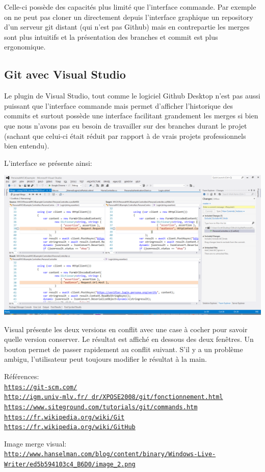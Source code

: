 Celle-ci possède des capacités plus limité que l’interface commande. Par exemple on ne peut pas cloner un directement depuis l’interface graphique un  repository d’un serveur git distant (qui n’est pas Github) mais en contrepartie les merges sont plus intuitifs et la présentation des branches et commit est plus ergonomique.

\subsection{Git avec Visual Studio}

Le plugin de Visual Studio, tout comme le logiciel Github Desktop n’est pas aussi puissant que l’interface commande mais permet d’afficher l’historique des commits et surtout possède une interface facilitant grandement les merges si bien que nous n’avons pas eu besoin de travailler sur des branches durant le projet (sachant que celui-ci était réduit par rapport à de vrais projets professionnels bien entendu).

L’interface se présente ainsi:

\begin{center}
	\includegraphics[width=.8\textwidth]{images/visual.png}
\end{center}

Visual présente les deux versions en conflit avec une case à cocher pour savoir quelle version conserver. Le résultat est affiché en dessous des deux fenêtres. Un bouton permet de passer rapidement au conflit suivant. S’il y a un problème ambigu, l’utilisateur peut toujours modifier le résultat à la main.
 
\noindent Références:\\
\href{https://git-scm.com/}{\texttt{https://git-scm.com/}}\\
\href{http://igm.univ-mlv.fr/~dr/XPOSE2008/git/fonctionnement.html}{\texttt{http://igm.univ-mlv.fr/~dr/XPOSE2008/git/fonctionnement.html}}\\
\href{https://www.siteground.com/tutorials/git/commands.htm}{\texttt{https://www.siteground.com/tutorials/git/commands.htm}}\\
\href{https://fr.wikipedia.org/wiki/Git}{\texttt{https://fr.wikipedia.org/wiki/Git}}\\
\href{https://fr.wikipedia.org/wiki/GitHub}{\texttt{https://fr.wikipedia.org/wiki/GitHub}}

\noindent Image merge visual:\\
\href{http://www.hanselman.com/blog/content/binary/Windows-Live-Writer/ed5b594103c4\_B6D0/image\_2.png}{\texttt{http://www.hanselman.com/blog/content/binary/Windows-Live-Writer/ed5b594103c4\_B6D0/image\_2.png}}